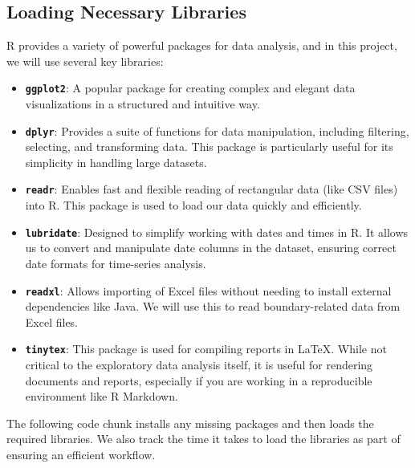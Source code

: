\documentclass[
]{article}
\providecommand{\tightlist}{%
  \setlength{\itemsep}{0pt}\setlength{\parskip}{0pt}}
\begin{document}
\subsection{Loading Necessary
Libraries}\label{loading-necessary-libraries}

R provides a variety of powerful packages for data analysis, and in this
project, we will use several key libraries:

\begin{itemize}
\tightlist
\item
  \textbf{\texttt{ggplot2}}: A popular package for creating complex and
  elegant data visualizations in a structured and intuitive way.
\item
  \textbf{\texttt{dplyr}}: Provides a suite of functions for data
  manipulation, including filtering, selecting, and transforming data.
  This package is particularly useful for its simplicity in handling
  large datasets.
\item
  \textbf{\texttt{readr}}: Enables fast and flexible reading of
  rectangular data (like CSV files) into R. This package is used to load
  our data quickly and efficiently.
\item
  \textbf{\texttt{lubridate}}: Designed to simplify working with dates
  and times in R. It allows us to convert and manipulate date columns in
  the dataset, ensuring correct date formats for time-series analysis.
\item
  \textbf{\texttt{readxl}}: Allows importing of Excel files without
  needing to install external dependencies like Java. We will use this
  to read boundary-related data from Excel files.
\item
  \textbf{\texttt{tinytex}}: This package is used for compiling reports
  in LaTeX. While not critical to the exploratory data analysis itself,
  it is useful for rendering documents and reports, especially if you
  are working in a reproducible environment like R Markdown.
\end{itemize}

The following code chunk installs any missing packages and then loads
the required libraries. We also track the time it takes to load the
libraries as part of ensuring an efficient workflow.
\end{document}
